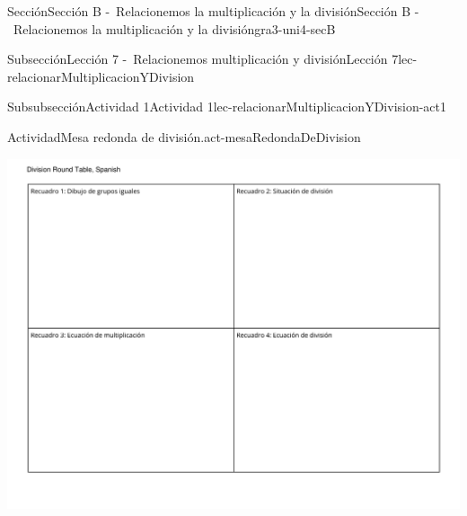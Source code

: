 \begin{sectionptx}{Sección}{Sección B -~Relacionemos la multiplicación y la división}{}{Sección B -~Relacionemos la multiplicación y la división}{}{}{gra3-uni4-secB}
\begin{subsectionptx}{Subsección}{Lección 7 -~Relacionemos multiplicación y división}{}{Lección 7}{}{}{lec-relacionarMultiplicacionYDivision}
\begin{subsubsectionptx}{Subsubsección}{Actividad 1}{}{Actividad 1}{}{}{lec-relacionarMultiplicacionYDivision-act1}
\begin{activity}{Actividad}{Mesa redonda de división.}{act-mesaRedondaDeDivision}
\begin{image}{0}{1}{0}{}%
\includegraphics[trim=20 20 20 30, clip, width=1.3\linewidth,angle=90,origin=c]{external/blm/pdf-source/mesa-redonda-de-division.pdf}
\end{image}%
\end{activity}%
\end{subsubsectionptx}
%
%
\typeout{************************************************}
\typeout{************************************************}
%


\end{subsectionptx}
\end{sectionptx}
